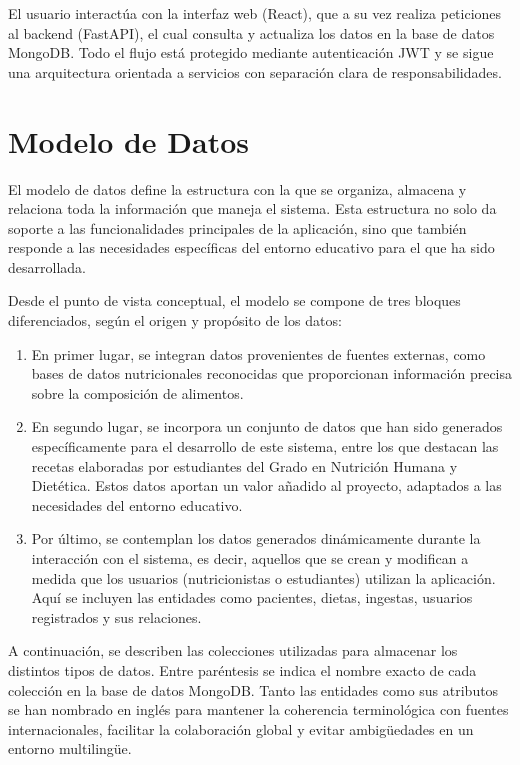 El usuario interactúa con la interfaz web (React), que a su vez realiza peticiones al backend (FastAPI), el cual consulta y actualiza los datos en la base de datos MongoDB. Todo el flujo está protegido mediante autenticación JWT y se sigue una arquitectura orientada a servicios con separación clara de responsabilidades.

\section{Modelo de Datos}
El modelo de datos define la estructura con la que se organiza, almacena y relaciona toda la información que maneja el sistema. Esta estructura no solo da soporte a las funcionalidades principales de la aplicación, sino que también responde a las necesidades específicas del entorno educativo para el que ha sido desarrollada.

Desde el punto de vista conceptual, el modelo se compone de tres bloques diferenciados, según el origen y propósito de los datos:

\begin{enumerate}
    \item En primer lugar, se integran datos provenientes de fuentes externas, como bases de datos nutricionales reconocidas que proporcionan información precisa sobre la composición de alimentos. 
    
    \item En segundo lugar, se incorpora un conjunto de datos que han sido generados específicamente para el desarrollo de este sistema, entre los que destacan las recetas elaboradas por estudiantes del Grado en Nutrición Humana y Dietética. Estos datos aportan un valor añadido al proyecto, adaptados a las necesidades del entorno educativo.

    \item Por último, se contemplan los datos generados dinámicamente durante la interacción con el sistema, es decir, aquellos que se crean y modifican a medida que los usuarios (nutricionistas o estudiantes) utilizan la aplicación. Aquí se incluyen las entidades como pacientes, dietas, ingestas, usuarios registrados y sus relaciones.
\end{enumerate}

A continuación, se describen las colecciones utilizadas para almacenar los distintos tipos de datos. Entre paréntesis se indica el nombre exacto de cada colección en la base de datos MongoDB. Tanto las entidades como sus atributos se han nombrado en inglés para mantener la coherencia terminológica con fuentes internacionales, facilitar la colaboración global y evitar ambigüedades en un entorno multilingüe.

